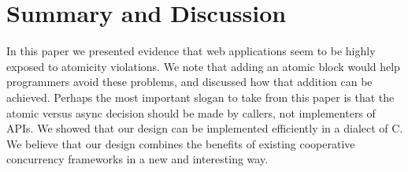 \documentclass[sigplan,10pt,review,anonymous]{acmart}\settopmatter{printfolios=true,printccs=false,printacmref=false}
\begin{document}





\section{Summary and Discussion}

In this paper we presented evidence that web applications seem to be highly exposed to atomicity violations.
We note that adding an atomic block would help programmers avoid these problems, and discussed how that addition can be achieved.
Perhaps the most important slogan to take from this paper is that the atomic versus async decision should be made by callers, not implementers of APIs.
We showed that our design can be implemented efficiently in a dialect of C.
We believe that our design combines the benefits of existing cooperative concurrency frameworks in a new and interesting way.


\end{document}

